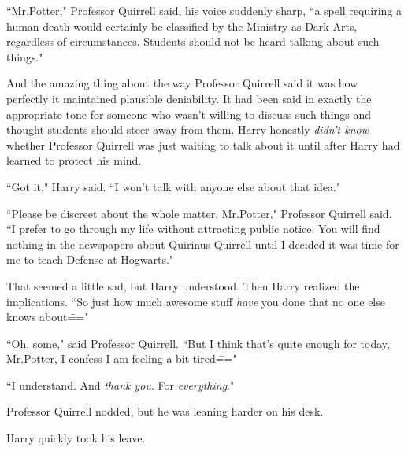 ``Mr.\?Potter," Professor Quirrell said, his voice suddenly sharp, ``a spell requiring a human death would certainly be classified by the Ministry as Dark Arts, regardless of circumstances. Students should not be heard talking about such things."

And the amazing thing about the way Professor Quirrell said it was how perfectly it maintained plausible deniability. It had been said in exactly the appropriate tone for someone who wasn't willing to discuss such things and thought students should steer away from them. Harry honestly \emph{didn't know} whether Professor Quirrell was just waiting to talk about it until after Harry had learned to protect his mind.

``Got it," Harry said. ``I won't talk with anyone else about that idea."

``Please be discreet about the whole matter, Mr.\?Potter," Professor Quirrell said. ``I prefer to go through my life without attracting public notice. You will find nothing in the newspapers about Quirinus Quirrell until I decided it was time for me to teach Defense at Hogwarts."

That seemed a little sad, but Harry understood. Then Harry realized the implications. ``So just how much awesome stuff \emph{have} you done that no one else knows about\==="

``Oh, some," said Professor Quirrell. ``But I think that's quite enough for today, Mr.\?Potter, I confess I am feeling a bit tired\==="

``I understand. And \emph{thank you}. For \emph{everything}."

Professor Quirrell nodded, but he was leaning harder on his desk.

Harry quickly took his leave.

